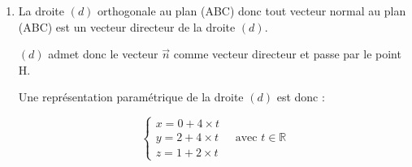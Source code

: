 \documentclass[10pt]{article}
\providecommand{\R}{\mathbb{R}}
\providecommand{\vect}[1]{\overrightarrow{#1}}
\providecommand{\vectt}[1]{\overrightarrow{\mathrm{#1}}}
\begin{document}
\begin{enumerate}
	Comme le repère est orthonormé, le produit scalaire peut se calculer avec la formule analytique :
	\quad $\vectt{AB}\cdot\vectt{AH} = 1 \times (-1) +1 \times 2 -4 \times (-2) = -1 +2 +8=9$.


	Comme on est dans un repère orthonormé :

	$\mathrm{AB}=\sqrt{ {x_{\vectt{AB}}}^2  + {y_{\vectt{AB}}}^2  +{z_{\vectt{AB}}}^2 } = \sqrt{ 1^2+ 1^2+(-4)^2}= \sqrt{1+1+16}=\sqrt{18} = 3 \sqrt{2}$.

	et de même :  $\mathrm{AH}=\sqrt{  (-1)^2 +2^2+(-2)^2}= \sqrt{ 1+4+4}= \sqrt{9}=3$.

	L'expression trigonométrique du produit scalaire donne :

	$\begin{aligned}
		\vectt{AB}\cdot\vectt{AH}
		&= \mathrm{AB} \times \mathrm{AH} \times \cos\left(\widehat{\mathrm{BAH}}\right)
	\end{aligned}$

	donc, avec les valeurs connues :\quad $\begin{aligned}[t]
		\vectt{AB}\cdot\vectt{AH}
		&= 3 \sqrt{2} \times 3\times \cos\left(\widehat{\mathrm{BAH}}\right)\\
		&=  9 \sqrt{2} \cos\left(\widehat{\mathrm{BAH}}\right)
	\end{aligned}$

	On a donc deux expressions du même produit scalaire, ce qui donne :

	$ 9= 9 \sqrt{2} \cos\left(\widehat{\mathrm{BAH}}\right) \iff \cos\left(\widehat{\mathrm{BAH}}\right) = \dfrac{1}{\sqrt{2}} = \dfrac{\sqrt{2}}{2} $

	D'où : $\widehat{\mathrm{BAH}} =45 ^\circ$.






	\item La droite $(d)$ orthogonale au plan (ABC)  donc tout vecteur normal au plan (ABC) est un vecteur directeur de la droite $(d)$.

	$(d)$ admet donc le vecteur $\vect{n}$ comme vecteur directeur et passe par le point H.

	Une représentation paramétrique de la droite $(d)$ est donc :

	\[\begin{cases}
		x=0 + 4 \times   t\\
		y=2 + 4 \times t \\
		z=1 +2 \times  t
	\end{cases} \quad \text{avec } t \in \R\]


\end{enumerate}
\end{document}
